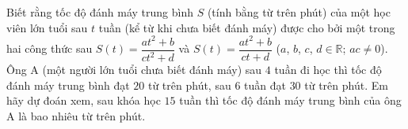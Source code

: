 \begin{bt}%
	Biết rằng tốc độ đánh máy trung bình $S$ (tính bằng từ trên phút) của một học viên lớn tuổi sau $t$ tuần (kể từ khi chưa biết đánh máy) được cho bởi một trong hai công thức sau $S(t)=\dfrac{a t^2+b}{c t^2+d}$ và $S(t)=\dfrac{a t^2+b}{c t+d}$ ($a$, $b$, $c$, $d \in \mathbb{R}$; $a c  \neq 0$).
	Ông A (một người lớn tuổi chưa biết đánh máy) sau $4$ tuần đi học thì tốc độ đánh máy trung bình đạt $20$ từ trên phút, sau $6$ tuần đạt $30$ từ trên phút. Em hãy dự đoán xem, sau khóa học $15$ tuần thì tốc độ đánh máy trung bình của ông A là bao nhiêu từ trên phút. 
\end{bt}

